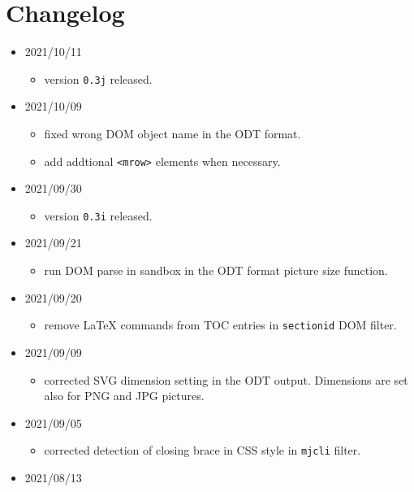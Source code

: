 \hypertarget{changelog}{%
\section{Changelog}\label{changelog}}

\begin{itemize}
\item
  2021/10/11

  \begin{itemize}
  \tightlist
  \item
    version \texttt{0.3j} released.
  \end{itemize}
\item
  2021/10/09

  \begin{itemize}
  \tightlist
  \item
    fixed wrong DOM object name in the ODT format.
  \item
    add addtional \texttt{\textless{}mrow\textgreater{}} elements when
    necessary.
  \end{itemize}
\item
  2021/09/30

  \begin{itemize}
  \tightlist
  \item
    version \texttt{0.3i} released.
  \end{itemize}
\item
  2021/09/21

  \begin{itemize}
  \tightlist
  \item
    run DOM parse in sandbox in the ODT format picture size function.
  \end{itemize}
\item
  2021/09/20

  \begin{itemize}
  \tightlist
  \item
    remove LaTeX commands from TOC entries in \texttt{sectionid} DOM
    filter.
  \end{itemize}
\item
  2021/09/09

  \begin{itemize}
  \tightlist
  \item
    corrected SVG dimension setting in the ODT output. Dimensions are
    set also for PNG and JPG pictures.
  \end{itemize}
\item
  2021/09/05

  \begin{itemize}
  \tightlist
  \item
    corrected detection of closing brace in CSS style in \texttt{mjcli}
    filter.
  \end{itemize}
\item
  2021/08/13


\end{itemize}
